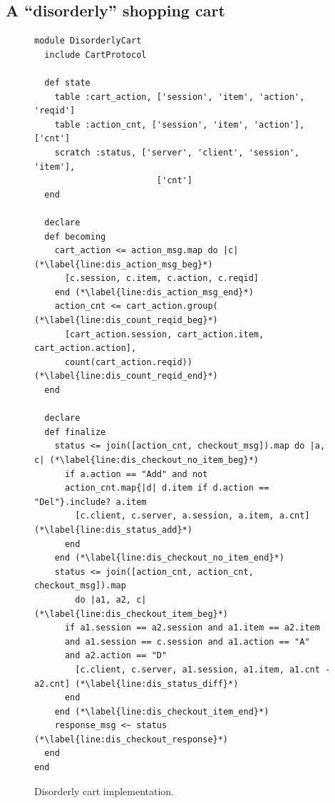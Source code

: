 \subsection{A ``disorderly'' shopping cart}

\begin{figure}[t]
\begin{scriptsize}
\begin{lstlisting}
module DisorderlyCart
  include CartProtocol

  def state
    table :cart_action, ['session', 'item', 'action', 'reqid']
    table :action_cnt, ['session', 'item', 'action'], ['cnt']
    scratch :status, ['server', 'client', 'session', 'item'],
                        ['cnt']
  end

  declare
  def becoming
    cart_action <= action_msg.map do |c|  (*\label{line:dis_action_msg_beg}*)
      [c.session, c.item, c.action, c.reqid] 
    end (*\label{line:dis_action_msg_end}*)
    action_cnt <= cart_action.group(  (*\label{line:dis_count_reqid_beg}*)
      [cart_action.session, cart_action.item, cart_action.action],
      count(cart_action.reqid))  (*\label{line:dis_count_reqid_end}*)
  end

  declare
  def finalize
    status <= join([action_cnt, checkout_msg]).map do |a, c| (*\label{line:dis_checkout_no_item_beg}*)
      if a.action == "Add" and not 
      action_cnt.map{|d| d.item if d.action == "Del"}.include? a.item
        [c.client, c.server, a.session, a.item, a.cnt] (*\label{line:dis_status_add}*)
      end
    end (*\label{line:dis_checkout_no_item_end}*)
    status <= join([action_cnt, action_cnt, checkout_msg]).map 
        do |a1, a2, c| (*\label{line:dis_checkout_item_beg}*)
      if a1.session == a2.session and a1.item == a2.item
      and a1.session == c.session and a1.action == "A" 
      and a2.action == "D"
        [c.client, c.server, a1.session, a1.item, a1.cnt - a2.cnt] (*\label{line:dis_status_diff}*)
      end
    end (*\label{line:dis_checkout_item_end}*)
    response_msg <~ status (*\label{line:dis_checkout_response}*)
  end
end
\end{lstlisting}
\vspace{-10pt}
\caption{Disorderly cart implementation.}
\label{fig:dis-cart}
\end{scriptsize}
\vspace{-2pt}
\end{figure}

